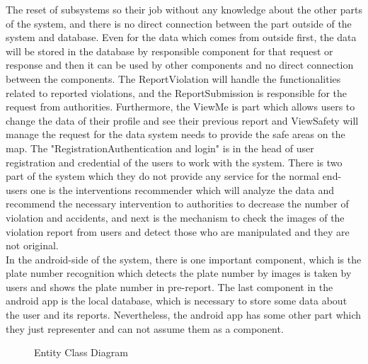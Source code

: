   The reset of subsystems so their job without any knowledge about the other parts of the system, and there is no direct connection between the part outside of the system and database. Even for the data which comes from outside first, the data will be stored in the database by responsible component for that request or response and then it can be used by other components and no direct connection between the components. The ReportViolation will handle the functionalities related to reported violations, and the ReportSubmission is responsible for the request from authorities. Furthermore, the ViewMe is part which allows users to change the data of their profile and see their previous report and ViewSafety will manage the request for the data system needs to provide the safe areas on the map. The "Registration\/Authentication and login" is in the head of user registration and credential of the users to work with the system. There is two part of the system which they do not provide any service for the normal end-users one is the interventions recommender which will analyze the data and recommend the necessary intervention to authorities to decrease the number of violation and accidents, and next is the mechanism to check the images of the violation report from users and detect those who are manipulated and they are not original.\\
  In the android-side of the system, there is one important component, which is the plate number recognition which detects the plate number by images is taken by users and shows the plate number in pre-report. The last component in the android app is the local database, which is necessary to store some data about the user and its reports. Nevertheless, the android app has some other part which they just representer and can not assume them as a component.


\begin{sidewaysfigure}
\begin{figure}[H]
\caption{Entity Class Diagram}
\label{fig:Class}
\centering

\end{figure}
\end{sidewaysfigure}

